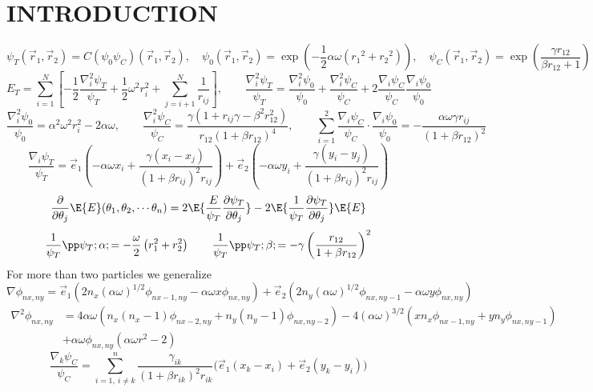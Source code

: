 \documentclass[11pt,english,a4paper]{article}
\begin{document}
\section*{\uppercase{Introduction}}
\[
\psi_T(\vec{r}_1, \vec{r}_2) = C(\psi_0 \psi_C)(\vec{r}_1, \vec{r}_2), \quad  \psi_0(\vec{r}_1, \vec{r}_2) = \exp \left(-\frac{1}{2} \alpha  \omega  \left( {{r}_1}^2+  {{r}_2}^2\right)\right),  \quad  \psi_C(\vec{r}_1, \vec{r}_2) =  \exp \left( \frac{\gamma r_{  12}}{\beta  r_{  12}+1} \right)
\]
\[
E_T = \sum_{i=1}^N \left[ -\frac{1}{2} \frac{\nabla^2_i \psi_T}{\psi_T} + \frac{1}{2} \omega^2 r_i^2 + \sum_{j=i+1}^N \frac{1}{r_{ij}} \right], \qquad \frac{\nabla_i^2 \psi_T}{\psi_T} = \frac{\nabla_i^2 \psi_0}{\psi_0} + \frac{\nabla_i^2 \psi_C}{\psi_C} + 2\frac{\nabla_i \psi_C}{\psi_C}\frac{\nabla_i \psi_0}{\psi_0}
\]
\[
\frac{\nabla_i^2 \psi_0}{\psi_0} = \alpha^2 \omega^2 r_i^2 - 2 \alpha \omega, \qquad
\frac{\nabla_i^2 \psi_C}{\psi_C} = \frac{\gamma (1 + r_{ij} \gamma - \beta^2 r_{  12}^2)}{r_{  12}(1 + \beta r_{  12})^4}, \qquad \sum_{i=1}^2 \frac{\nabla_i \psi_C}{\psi_C}\cdot \frac{\nabla_i \psi_0}{\psi_0} = - \frac{\alpha \omega \gamma r_{ij}}{(1 + \beta r_{12})^2}
\]
\[
\frac{\nabla_i \psi_T}{\psi_T} = \vec{e}_1 \left( -\alpha \omega x_i + \frac{\gamma(x_i - x_j)}{(1 + \beta r_{ij})^2r_{ij}} \right) + \vec{e}_2 \left( - \alpha \omega y_i + \frac{\gamma(y_i-y_j)}{(1 + \beta r_{ij})^2r_{ij}} \right)
\]
\[
\frac{\partial}{\partial \theta_j} \E{E}(\theta_1,\theta_2,\cdots \theta_n) = 2 \E{\frac{E}{\psi_T} \frac{\partial \psi_T}{\partial \theta_j} } - 2\E{\frac{1}{\psi_T} \frac{\partial \psi_T}{\partial \theta_j} }\E{E}
\]
\[
\frac{1}{\psi_T}\pp \psi_T; \alpha; = - \frac{\omega}{2} \left( r_1^2 + r_2^2 \right) \qquad 
\frac{1}{\psi_T}\pp \psi_T; \beta; = - \gamma \left( \frac{r_{12}}{1 + \beta r_{12}} \right)^2
\]
For more than two particles we generalize
\[
\nabla \phi_{  nx,ny} = \vec{e}_1 \left( 2n_x (\alpha \omega)^{1/2} \phi_{  nx-1,ny} - \alpha \omega x \phi_{  nx,ny} \right) + \vec{e}_2 \left( 2n_y(\alpha\omega)^{1/2} \phi_{  nx,ny-1} - \alpha \omega y \phi_{  nx,ny} \right)
\]
\begin{align*}
\nabla^2 \phi_{  nx,ny} &= 4 \alpha \omega \left( n_x (n_x - 1)\phi_{  nx-2,ny} + n_y(n_y - 1)\phi_{  nx,ny-2} \right)  -4 (\alpha \omega)^{3/2} \left( x n_x\phi_{  nx-1,ny} + yn_y \phi_{  nx,ny-1} \right) \\
&+ \alpha \omega \phi_{  nx,ny}\left( \alpha\omega r^2 - 2 \right)
\end{align*}
\[
\frac{\nabla_k \psi_C}{\psi_C} = \sum_{  i=1, \ i \neq k}^n \frac{\gamma_{ik}}{(1 + \beta r_{ik})^2 r_{ik}} \Big( \vec e_1 (x_k -x_i) + \vec e_2 (y_k -y_i) \Big)
\]
\end{document}

